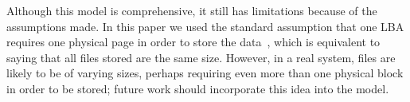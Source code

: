 \documentclass[prodmode,acmtos]{acmsmall}
\begin{document}
Although this model is comprehensive, it still has limitations because of the assumptions made.  In this paper we used the standard assumption that one LBA requires one physical page in order to store the data~\cite{Hu2009,hu2010fundamental,agarwal2010closed,xiang2011improved}, which is equivalent to saying that all files stored are the same size.  However, in a real system, files are likely to be of varying sizes, perhaps requiring even more than one physical block in order to be stored; future work should incorporate this idea into the model.













\end{document}
